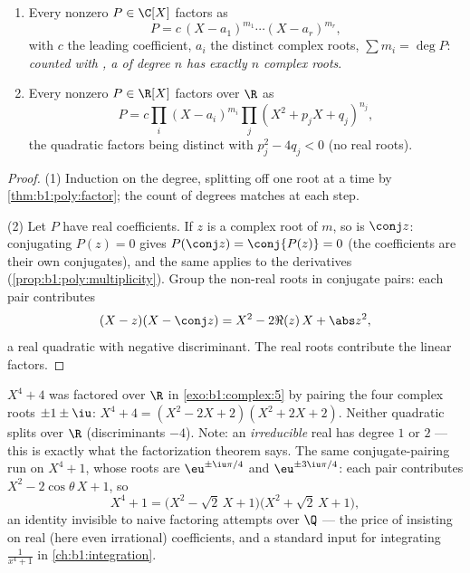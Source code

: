 \begin{corollary}\label{cor:b1:poly:factorization}
\begin{enumerate}
  \item Every nonzero $P \in \C[X]$ factors as
        \[
        P = c\, (X - a_1)^{m_1} \cdots (X - a_r)^{m_r},
        \]
        with $c$ the leading coefficient, $a_i$ the distinct complex
        roots, $\sum m_i = \deg P$: \emph{counted with ,
        a  of degree $n$ has exactly $n$ complex roots}.
  \item Every nonzero $P \in \R[X]$ factors over $\R$ as
        \[
        P = c \prod_i (X - a_i)^{m_i} \prod_j (X^2 + p_j X +
        q_j)^{n_j},
        \]
        the quadratic factors being distinct with $p_j^2 - 4q_j < 0$
        (no real roots).
\end{enumerate}
\end{corollary}

\begin{proof}
(1) Induction on the degree, splitting off one root at a time by
\cref{thm:b1:poly:factor}; the count of degrees matches at each step.

(2) Let $P$ have real coefficients. If $z$ is a complex root of
 $m$, so is $\conj z$: conjugating $P(z) = 0$ gives
$P(\conj z) = \conj{P(z)} = 0$ (the coefficients are their own
conjugates), and the same applies to the derivatives
(\cref{prop:b1:poly:multiplicity}). Group the non-real roots in
conjugate pairs: each pair contributes
\[
(X - z)(X - \conj z) = X^2 - 2\Re(z)\, X + \abs z^2 ,
\]
a real quadratic with negative discriminant. The real roots contribute
the linear factors.
\end{proof}

\begin{example}\label{ex:b1:poly:factorexample}
$X^4 + 4$ was factored over $\R$ in \cref{exo:b1:complex:5} by pairing
the four complex roots $\pm 1 \pm \iu$:
$X^4 + 4 = (X^2 - 2X + 2)(X^2 + 2X + 2)$. Neither quadratic splits
over $\R$ (discriminants $-4$). Note: an \emph{irreducible} real
 has degree $1$ or $2$ --- this is exactly what the
factorization theorem says. The same conjugate-pairing run on
$X^4 + 1$, whose roots are $\eu^{\pm\iu\pi/4}$ and
$\eu^{\pm3\iu\pi/4}$: each pair contributes $X^2 -
2\cos\theta\,X + 1$, so
\[
X^4 + 1 = \bigl(X^2 - \sqrt2\,X + 1\bigr)
\bigl(X^2 + \sqrt2\,X + 1\bigr) ,
\]
an identity invisible to naive factoring attempts over $\Q$ ---
the price of insisting on real (here even irrational)
coefficients, and a standard input for integrating $\frac1{x^4 +
1}$ in \cref{ch:b1:integration}.
\end{example}

